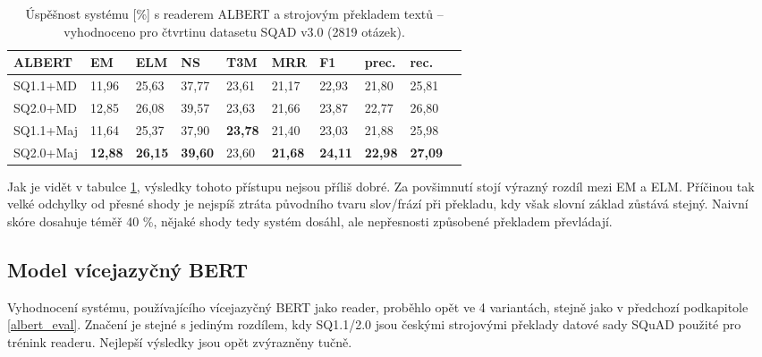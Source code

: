 \begin{table}[H]
    \centering
    \begin{tabular}{|l||l|l|l|l|l|l|l|l|l|}
        \hline
        \textbf{ALBERT}  & \textbf{EM}   & ELM       & NS        & T3M       & MRR       & \textbf{F1}   & prec.         & rec. \\ \hline\hline
            SQ1.1+MD    & 11,96         & 25,63     & 37,77     & 23,61     & 21,17     & 22,93         & 21,80         & 25,81    \\ \hline
            SQ2.0+MD    & 12,85         & 26,08     & 39,57     & 23,63     & 21,66     & 23,87         & 22,77         & 26,80    \\ \hline
            SQ1.1+Maj   & 11,64         & 25,37     & 37,90     & \textbf{23,78}     & 21,40     & 23,03         & 21,88         & 25,98    \\ \hline
            SQ2.0+Maj   & \textbf{12,88}& \textbf{26,15}& \textbf{39,60}& 23,60     & \textbf{21,68}     & \textbf{24,11}         & \textbf{22,98}         & \textbf{27,09}    \\ \hline
    \end{tabular}
    \caption{Úspěšnost systému [\%] s readerem ALBERT a strojovým překladem textů -- vyhodnoceno pro čtvrtinu datasetu SQAD v3.0 (2819 otázek).}
    \label{tab:system_eval_albert}
\end{table}
Jak je vidět v tabulce \ref{tab:system_eval_albert}, výsledky tohoto přístupu nejsou příliš dobré. Za povšimnutí stojí výrazný rozdíl mezi EM a ELM. Příčinou tak velké odchylky od přesné shody je nejspíš ztráta původního tvaru slov/frází při překladu, kdy však slovní základ zůstává stejný. Naivní skóre dosahuje téměř 40 \%, nějaké shody tedy systém dosáhl, ale nepřesnosti způsobené překladem převládají.

\subsection{Model vícejazyčný BERT}
\label{mbert_eval}
Vyhodnocení systému, používajícího vícejazyčný BERT jako reader, proběhlo opět ve 4 variantách, stejně jako v předchozí podkapitole \ref{albert_eval}. Značení je stejné s jediným rozdílem, kdy SQ1.1/2.0 jsou českými strojovými překlady datové sady SQuAD použité pro trénink readeru. Nejlepší výsledky jsou opět zvýrazněny tučně.


